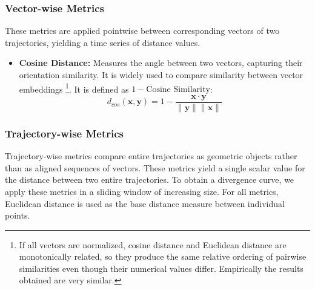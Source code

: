 \documentclass[a4paper,12pt]{article}
\begin{document}

\subsubsection{Vector-wise Metrics}
\label{sssec:methods_vector_metrics}
These metrics are applied pointwise between corresponding vectors of two trajectories, yielding a time series of distance values.
\begin{itemize}
    \item \textbf{Cosine Distance:} Measures the angle between two vectors, capturing their orientation similarity. It is widely used to compare similarity between vector embeddings \footnote{If all vectors are normalized, cosine distance and Euclidean distance are monotonically related, so they produce the same relative ordering of pairwise similarities even though their numerical values differ. Empirically the results obtained are very similar.}. It is defined as $1 - \text{Cosine Similarity}$:
    \begin{equation}
        d_{cos}(\mathbf{x}, \mathbf{y}) = 1 - \frac{\mathbf{x} \cdot \mathbf{y}}{\|\mathbf{y}\| \|\mathbf{x}\|}
    \end{equation}
\end{itemize}

\subsubsection{Trajectory-wise Metrics}
\label{sssec:methods_trajectory_metrics}
Trajectory-wise metrics compare entire trajectories as geometric objects rather than as aligned sequences of vectors. These metrics yield a single scalar value for the distance between two entire trajectories. To obtain a divergence curve, we apply these metrics in a sliding window of increasing size. For all metrics, Euclidean distance is used as the base distance measure between individual points.
\end{document}
